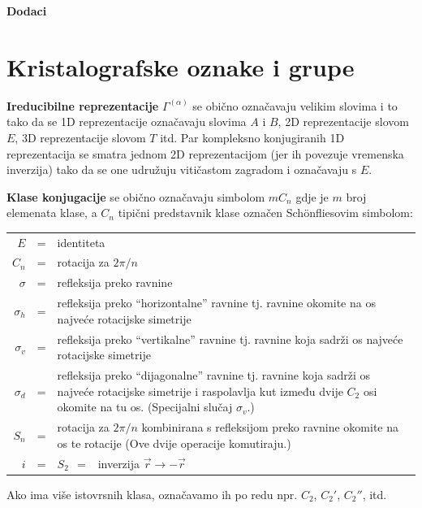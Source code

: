 
\appendix

\cleardoublepage
\vspace*{8cm}
\thispagestyle{empty}
\begin{flushright}
\Huge \bfseries Dodaci
\end{flushright}
\cleardoublepage

\chapter{Kristalografske oznake i grupe}
\label{sec:kristalografija}
\textbf{Ireducibilne reprezentacije} $\Gamma^{(\alpha)}$ se obično označavaju
velikim slovima i to tako da se 1D reprezentacije označavaju slovima
$A$ i $B$, 2D reprezentacije slovom $E$, 3D reprezentacije slovom $T$
itd. Par kompleksno konjugiranih 1D reprezentacija se smatra jednom
2D reprezentacijom (jer ih povezuje vremenska inverzija) tako da se
one udružuju vitičastom zagradom i označavaju s $E$.

\textbf{Klase konjugacije} se obično označavaju simbolom $mC_n$ gdje je $m$
broj elemenata klase, a $C_n$ tipični predstavnik klase označen
Sch\"{o}nfliesovim simbolom:
\begin{center}
\begin{tabular}{rcp{10cm}}
$E$ & = & identiteta \\
$C_n$ & = & rotacija za $2\pi/n$ \\
$\sigma$ & = & refleksija preko ravnine \\
$\sigma_{h}$ & = & refleksija preko ``horizontalne'' ravnine tj. ravnine
  okomite na os najveće rotacijske simetrije \\
$\sigma_{v}$ & = & refleksija preko ``vertikalne'' ravnine tj. ravnine
  koja sadrži os najveće rotacijske simetrije \\
$\sigma_{d}$ & = & refleksija preko ``dijagonalne'' ravnine tj. ravnine
  koja sadrži os najveće rotacijske simetrije i raspolavlja kut između
  dvije $C_2$ osi okomite na tu os. (Specijalni slučaj $\sigma_{v}$.) \\
$S_n$  & = & rotacija za $2\pi/n$ kombinirana s refleksijom preko ravnine
   okomite na os te rotacije (Ove dvije operacije komutiraju.) \\
$i$ & = &  $S_2 \;\, = \;\,$  inverzija $\vec{r} \to -\vec{r}$
\end{tabular}
\end{center}
Ako ima više istovrsnih klasa, označavamo ih po redu npr.
$C_{2}$, $C_{2}'$, $C_{2}''$, itd.


